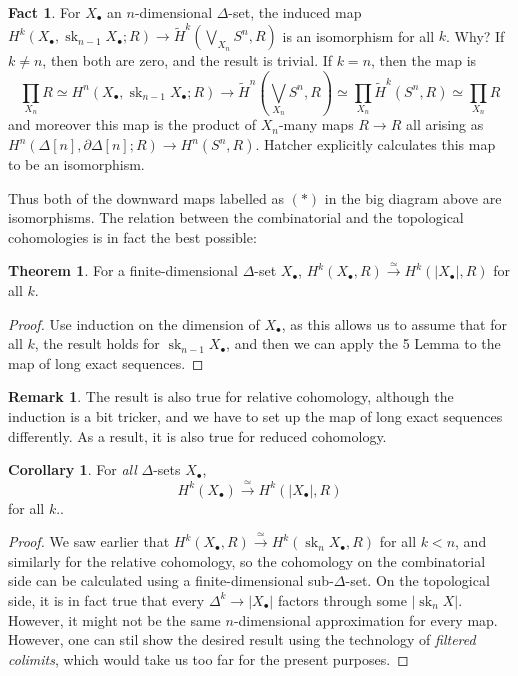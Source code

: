 \documentclass{tufte-handout}
\DeclareMathOperator{\sk}{sk}
\theoremstyle{definition}
\newtheorem{theorem}{Theorem}
\newtheorem{corollary}{Corollary}
\newtheorem*{rem}{Remark}
\newtheorem*{fact}{Fact}
\begin{document}
\begin{fact}
For $X_\bullet$ an $n$-dimensional $\Delta$-set, the induced map 
$H^k(X_\bullet,\sk_{n-1}X_\bullet;R) \to \widetilde{H}^k(\bigvee_{X_n}S^n,R)$ is an isomorphism 
for all $k$. Why? If $k\neq n$, then both are zero, and the result is trivial. If $k=n$, then the map is 
\[
	\prod_{X_n}R \simeq H^n(X_\bullet,\sk_{n-1}X_\bullet;R) \to \widetilde{H}^n(\bigvee_{X_n}S^n,R)\simeq \prod_{X_n} \widetilde{H}^k(S^n,R) \simeq \prod_{X_n} R
\]
and moreover this map is the product of $X_n$-many maps $R \to R$ all arising as 
$H^n(\Delta[n],\partial\Delta[n];R) \to H^n(S^n,R)$. Hatcher explicitly calculates this map to be an isomorphism.
\end{fact}

Thus both of the downward maps labelled as $(*)$ in the big diagram above are isomorphisms.
The relation between the combinatorial and the topological cohomologies is in fact the best possible:

\begin{theorem}
For a finite-dimensional $\Delta$-set $X_\bullet$, $H^k(X_\bullet,R) \xrightarrow{\simeq} H^k(|X_\bullet|,R)$ for all $k$.
\end{theorem}

\begin{proof}
Use induction on the dimension of $X_\bullet$, as this allows us to assume that for all $k$, the result
holds for $\sk_{n-1}X_\bullet$, and then we can apply the 5 Lemma to the map of long exact sequences.
\end{proof} 

\begin{rem}
The result is also true for relative cohomology, although the induction is a bit tricker, and we have to set up the map of long exact sequences differently. As a result, it is also true for reduced cohomology.
\end{rem}

\begin{corollary}
For \emph{all} $\Delta$-sets $X_\bullet$, 
\begin{equation}\label{eq:comparison_iso_simplicial_singular}
	H^k(X_\bullet) \xrightarrow{\simeq} H^k(|X_\bullet|,R)
\end{equation}
for all $k$..
\end{corollary}

\begin{proof}

We saw earlier that $H^k(X_\bullet,R) \xrightarrow{\simeq} H^k(\sk_nX_\bullet,R)$ for all $k<n$, and similarly 
for the relative cohomology, so the cohomology on the combinatorial side can be calculated using 
a finite-dimensional sub-$\Delta$-set. On the topological side, it is in fact true that every 
$\Delta^k \to |X_\bullet|$ factors through some $|\sk_nX|$. However, it might not be the same 
$n$-dimensional approximation for every map. However, one can stil show the desired result using
the technology of \emph{filtered colimits}, which would take us too far for the present purposes.
\end{proof}
\end{document}
